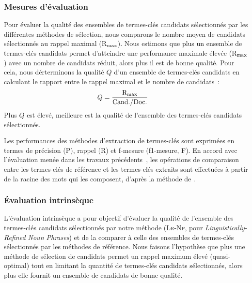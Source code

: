       \subsubsection{Mesures d'évaluation}
      \label{subsubsec:main:domain_independent_keyphrase_extraction-keyphrase_candidate_selection-evaluation-evaluation_measures}
        Pour évaluer la qualité des ensembles de termes-clés candidats
        sélectionnés par les différentes méthodes de sélection, nous comparons
        le nombre moyen de candidats sélectionnés au rappel maximal
        (R$_\textnormal{max}$). Nous estimons que plus un ensemble de
        termes-clés candidats permet d'atteindre une performance maximale élevée
        (R$_\textnormal{max}$) avec un nombre de candidats réduit, alors plus il
        est de bonne qualité. Pour cela, nous dérterminons la qualité $Q$ d'un
        ensemble de termes-clés candidats en calculant le rapport entre le
        rappel maximal et le nombre de candidats~:
        \begin{align}
          Q &= \frac{\textnormal{R}_{\textnormal{max}}}{\textnormal{Cand./Doc.}}
        \end{align}
        Plus $Q$ est élevé, meilleure est la qualité de l'ensemble des
        termes-clés candidats sélectionnés.

        Les performances des méthodes d'extraction de termes-clés sont exprimées
        en termes de précision (P), rappel (R) et f-mesure (f1-mesure, F). En
        accord avec l'évaluation menée dans les travaux
        précédents~\cite{kim2010semeval}, les opérations de comparaison entre
        les termes-clés de référence et les termes-clés extraits sont effectuées
        à partir de la racine des mots qui les composent, d'après la méthode de
        .

      \subsubsection{Évaluation intrinsèque}
      \label{subsubsec:main:domain_independent_keyphrase_extraction-keyphrase_candidate_selection-evaluation-intrinsic_evaluation}
        L'évaluation intrinsèque a pour objectif d'évaluer la qualité de
        l'ensemble des termes-clés candidats sélectionnés par notre méthode
        (\textsc{Lr-Np}, pour \textit{Linguistically-Refined Noun Phrases}) et
        de la comparer à celle des ensembles de termes-clés sélectionnés par les
        méthodes de référence. Nous faisons l'hypothèse que plus une
        méthode de sélection de candidats permet un rappel maximum élevé
        (quasi-optimal) tout en limitant la quantité de termes-clés candidats
        sélectionnés, alors plus elle fournit un ensemble de candidats de bonne
        qualité.

